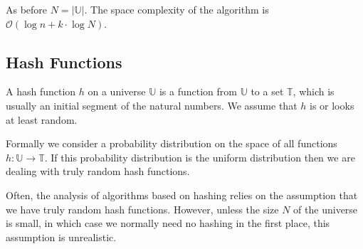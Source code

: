 \documentclass[english]{panikzettel}
\begin{document}
As before $N=|\mathbb{U}|$. The space complexity of the algorithm is $\mathcal{O}(\log n + k\cdot \log N)$.

\subsection{Hash Functions}
A hash function $h$ on a universe $\mathbb{U}$ is a function from $\mathbb{U}$ to a set $\mathbb{T}$, which is usually an initial segment of the natural numbers. We assume that $h$ is or looks at least random.

Formally we consider a probability distribution on the space of all functions $h:\mathbb{U}\to\mathbb{T}$. If this probability distribution is the uniform distribution then we are dealing with truly random hash functions.

Often, the analysis of algorithms based on hashing relies on the assumption that we have truly random hash functions. However, unless the size $N$ of the universe is small, in which case we normally need no hashing in the first place, this assumption is unrealistic.

%
\end{document}
